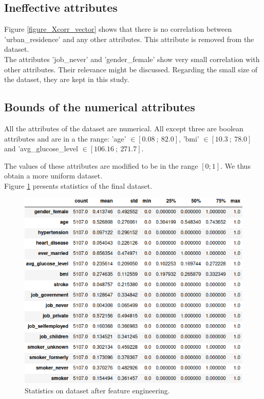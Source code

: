 \subsection{Ineffective attributes}
Figure \ref{figure_Xcorr_vector} shows that there is no correlation between 'urban\_residence' and 
any other attributes. This attribute is removed from the dataset.\\

The attributes 'job\_never' and 'gender\_female' show very small correlation with other attributes. 
Their relevance might be discussed. Regarding the small size of the dataset, they are kept in this 
study.

\subsection{Bounds of the numerical attributes}
All the attributes of the dataset are numerical. All except three are boolean attributes and are in 
a the range: 'age' $\in [0.08~;~82.0]$, 'bmi' $\in [10.3~;~78.0]$ and 'avg\_glucose\_level 
$\in [106.16~;~271.7]$.

The values of these attributes are modified to be in the range $[0;1]$. We thus obtain a more uniform 
dataset.\\

Figure \ref{figure_describe_final} presents statistics of the final dataset. 

\begin{figure}[H]
\centering
\includegraphics[scale=0.6]{figures/dataset_describe_final.png}
\caption{Statistics on dataset after feature engineering.}
\label{figure_describe_final}
\end{figure}

